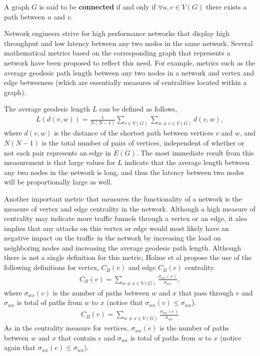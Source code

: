 \documentclass[11pt]{article}
\begin{document}
\begin{define}
A graph $G$ is said to be \textbf{connected} if and only if $\forall u,v \in V(G)$ there exists a path between $u$ and $v$.
\end{define}


Network engineers strive for high performance networks that display high throughput and low 
latency between any two nodes in the same network. Several mathematical metrics based on
the corresponding graph that represents a network have been proposed to reflect this need. 
For example, metrics such as the average geodesic path length between any two nodes in a network and vertex and edge betweeness (which are essentially measures of centralities located within a graph). 

The average geodesic length $L$ can be defined as follows,
\begin{eqnarray*}
L(d(v,w)) = \frac{1}{N(N-1)}\sum_{v \in V(G)}\sum_{w \not= v \in V(G)} d(v,w),
\end{eqnarray*}
where $d(v,w)$ is the distance of the shortest path between vertices $v$ and $w$, and $N(N-1)$ is the total number of pairs of vertices, independent of whether or not each pair represents an edge in $E(G)$. The most immediate result from this measurement is that large values for $L$ indicate that the average length between any two nodes in the network is long, and thus the latency between two nodes will be proportionally large as well. 

Another important metric that measures the functionality of a network is the measure of vertex and edge centrality in the network. Although a high measure of centrality may indicate more traffic funnels through a vertex or an edge, it also implies that any attacks on this vertex or edge would most likely have an negative impact on the traffic in the network by increasing the load on neighboring nodes and increasing the average geodesic path length. Although there is not a single definition for this metric, Holme et al \cite{ATTACKS} propose the use of the following definitions for vertex, $C_{B}(v)$ and edge $C_{B}(e)$ centrality.
\begin{eqnarray*}
C_{B}(v) = \sum_{w \not= x \in V(G)} \frac{\sigma_{wx}(v)}{\sigma_{wx}},
\end{eqnarray*}
where $\sigma_{wx}(v)$ is the number of paths between $w$ and $x$ that pass through $v$ and $\sigma_{wx}$ is total of paths from $w$ to $x$ (notice that $\sigma_{wx}(v) \leq \sigma_{wx}$).
\begin{eqnarray*}
C_{B}(v) = \sum_{w \not= x \in V(G)} \frac{\sigma_{wx}(e)}{\sigma_{wx}}
\end{eqnarray*}
As in the centrality measure for vertices, $\sigma_{wx}(e)$ is the number of paths between $w$ and $x$ that contain $e$ and $\sigma_{wx}$ is total of paths from $w$ to $x$ (notice again that $\sigma_{wx}(e) \leq \sigma_{wx}$).
\end{document}
